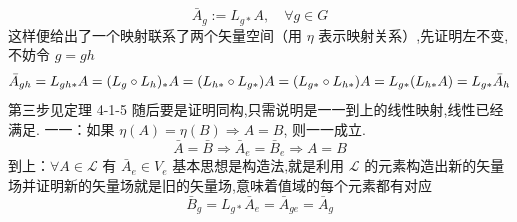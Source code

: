 \documentclass[../main.tex]{subfiles}
\begin{document}
    $$ \bar{A}_g := L_{g*}A,\quad\forall g \in G $$
这样便给出了一个映射联系了两个矢量空间（用 $\eta$ 表示映射关系）,先证明左不变,不妨令 $g = gh$
    $$ \bar{A}_{gh} = L_{gh *}A = (L_g\circ L_h)_* A = (L_{h *}\circ L_{g*})A = (L_{g *}\circ L_{h*})A \\= L_{g *}(L_{h*}A) = L_{g*}\bar{A}_h $$
第三步见定理 4-1-5
随后要是证明同构,只需说明是一一到上的线性映射,线性已经满足.
一一：如果 $\eta(A) = \eta(B) \Rightarrow A=B$, 则一一成立.
    $$ \bar{A} = \bar{B}\Rightarrow \bar{A}_e = \bar{B}_e \Rightarrow A = B $$
到上：$\forall A \in \mathscr{L}$ 有 $\bar{A}_e \in V_e$
基本思想是构造法,就是利用 $\mathscr{L}$ 的元素构造出新的矢量场并证明新的矢量场就是旧的矢量场,意味着值域的每个元素都有对应
    $$ \bar{B}_g = L_{g*}\bar{A}_e = \bar{A}_{ge} = \bar{A}_g $$
\end{document}
